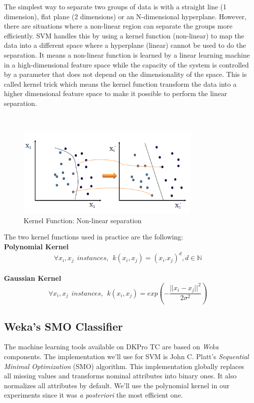 The simplest way to separate two groups of data is with a straight line (1 dimension), flat plane (2 dimensions) or an N-dimensional hyperplane. However, there are situations where a non-linear region can separate the groups more efficiently. SVM handles this by using a kernel function (non-linear) to map the data into a different space where a hyperplane (linear) cannot be used to do the separation. It means a non-linear function is learned by a linear learning machine in a high-dimensional feature space while the capacity of the system is controlled by a parameter that does not depend on the dimensionality of the space. This is called kernel trick which means the kernel function transform the data into a higher dimensional feature space to make it possible to perform the linear separation.  

\
\begin{figure}[H]
    \centering
    \includegraphics[width=0.8\textwidth]{fig/svm-kernel.png}
    \caption[Short caption]{Kernel Function: Non-linear separation}
    \label{fig:svm-kernel}
\end{figure}

The two kernel functions used in practice are the following:
\\
\textbf{Polynomial Kernel}
\begin{equation*}
\forall x_i, x_j \: \: instances, \: \: k(x_i, x_j) = (x_i.x_j)^d, d \in \mathbb{N}
\end{equation*}
\\
\textbf{Gaussian Kernel}
\begin{equation*}
\forall x_i, x_j \: \: instances, \: \: k(x_i, x_j) = exp(-\frac{||x_i - x_j||^2}{2 \sigma^2})
\end{equation*}

\subsection{Weka's SMO Classifier}
The machine learning tools available on DKPro TC are based on \emph{Weka} components. The implementation we'll use for SVM is John C. Platt's \emph{Sequential Minimal Optimization} (SMO) algorithm\cite{Platt:1999}.  This implementation globally replaces all missing values and transforms nominal attributes into binary ones. It also normalizes all attributes by default. We'll use the polynomial kernel in our experiments since it was \emph{a posteriori} the most efficient one.


